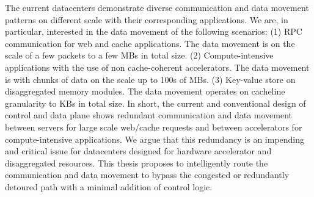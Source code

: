 %
The current datacenters demonstrate diverse communication and data movement patterns on different scale with their corresponding applications.
% 
We are, in particular, interested in the data movement of the following scenarios: 
(1) RPC communication for web and cache applications. The data movement is on the scale of a few packets to a few MBs in total size.
%
(2) Compute-intensive applications with the use of non cache-coherent accelerators. The data movement is with chunks of data on the scale up to 100s of MBs.
%
(3) Key-value store on disaggregated memory modules. The data movement operates on cacheline granularity to KBs in total size.  
%
In short, the current and conventional design of control and data plane shows redundant communication and data movement between servers for large scale web/cache requests and between accelerators for compute-intensive applications.
%
We argue that this redundancy is an impending and critical issue for datacenters designed for hardware accelerator and disaggregated resources. 
%
This thesis proposes to intelligently route the communication and data movement to bypass the congested or redundantly detoured path with a minimal addition of control logic. 
%




%
